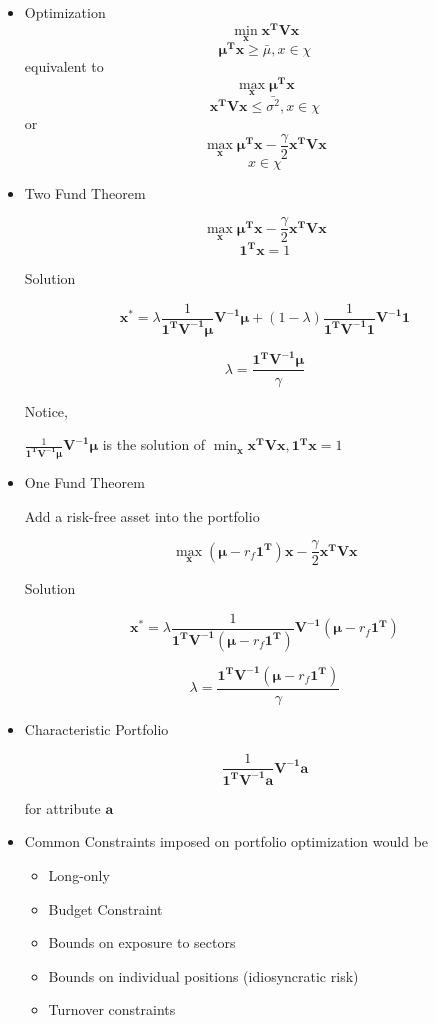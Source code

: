 \documentclass[11pt, openany]{book}              %
\newcommand\tab[1][1cm]{\hspace*{#1}}
\begin{document}
\begin{itemize}
	\item Optimization
$$ \min_{\mathbf{x}} \mathbf{x^TVx} $$
$$ \boldsymbol{ \mu^T x} \geq \bar{\mu}, x \in \chi$$
equivalent to 
$$ \max_{\mathbf{x}} \boldsymbol{ \mu^T x} $$
$$  \mathbf{x^TVx} \leq \bar{\sigma^2}, x \in \chi$$
or
$$ \max_{\mathbf{x}} \boldsymbol{ \mu^T x}  - \frac{\gamma}{2} \mathbf{x^TVx} $$
$$ x \in \chi$$

\item Two Fund Theorem

$$ \max_{\mathbf{x}} \boldsymbol{\mu^T x}  - \frac{\gamma}{2} \mathbf{x^TVx} $$
$$ \mathbf{1^Tx} = 1$$

Solution 

$$ \mathbf{x^*} = \lambda \frac{1}{\boldsymbol{1^TV^{-1}\mu}}\boldsymbol{V^{-1}\mu} + (1 - \lambda)\frac{1}{\mathbf{1^TV^{-1}1}}\mathbf{V^{-1}1}$$

$$\lambda = \frac{\boldsymbol{1^TV^{-1}\mu}}{\gamma}$$

Notice, 

\tab $\frac{1}{\mathbf{1^TV^{-1}\mu}}\boldsymbol{V^{-1}\mu}$ is the solution of $\min_{\mathbf{x}} \mathbf{x^TVx}, \mathbf{1^Tx} = 1$

\item One Fund Theorem

Add a risk-free asset into the portfolio

$$ \max_{\mathbf{x}} (\boldsymbol{\mu} - r_f\mathbf{1^T}) \mathbf{x} - \frac{\gamma}{2} \mathbf{x^TVx} $$

Solution

$$ \mathbf{x^*} = \lambda \frac{1}{\mathbf{1^TV^{-1}}(\boldsymbol{\mu} - r_f\mathbf{1^T})}\boldsymbol{V^{-1}}(\boldsymbol{\mu} - r_f \mathbf{1^T})$$

$$\lambda = \frac{\mathbf{1^TV^{-1}}(\boldsymbol{\mu} - r_f\mathbf{1^T})}{\gamma}$$

\item Characteristic Portfolio

$$\frac{1}{\boldsymbol{1^TV^{-1}a}}\boldsymbol{V^{-1}a}$$

for attribute $\mathbf{a}$

\item Common Constraints imposed on portfolio optimization would be
	\begin{itemize}
		\item Long-only
		\item Budget Constraint 
		\item Bounds on exposure to sectors
		\item Bounds on individual positions (idiosyncratic risk)
		\item Turnover constraints
	\end{itemize}
\end{itemize}
\end{document}
